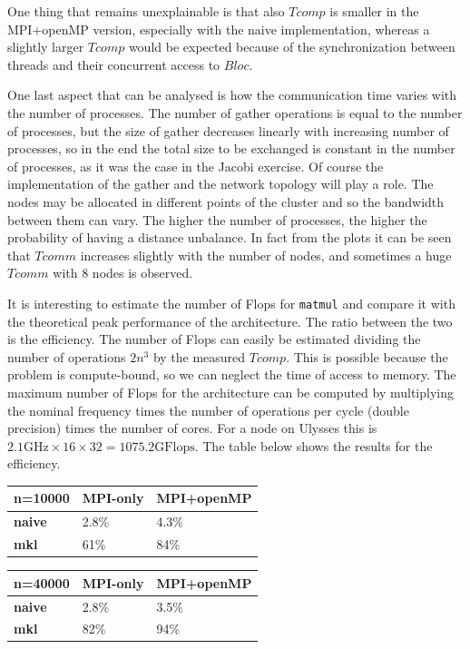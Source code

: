 \documentclass[12pt]{extarticle}
\begin{document}
One thing that remains unexplainable is that also $Tcomp$ is smaller in the MPI+openMP version, especially with the naive implementation, whereas a slightly larger $Tcomp$ would be expected because of the synchronization between threads and their concurrent access to $Bloc$. 
 
One last aspect that can be analysed is how the communication time varies with the number of processes. The number of gather operations is equal to the number of processes, but the size of gather decreases linearly with increasing number of processes, so in the end the total size to be exchanged is constant in the number of processes, as it was the case in the Jacobi exercise. Of course the implementation of the gather and the network topology will play a role. The nodes may be allocated in different points of the cluster and so the bandwidth between them can vary. The higher the number of processes, the higher the probability of having a distance unbalance. In fact from the plots it can be seen that $Tcomm$ increases slightly with the number of nodes, and sometimes a huge $Tcomm$ with 8 nodes is observed.

It is interesting to estimate the number of Flops for \texttt{matmul} and compare it with the theoretical peak performance of the architecture. The ratio between the two is the efficiency.
The number of Flops can easily be estimated dividing the number of operations $2n^3$ by the measured $Tcomp$. This is possible because the problem is compute-bound, so we can neglect the time of access to memory. The maximum number of Flops for the architecture can be computed by multiplying the nominal frequency times the number of operations per cycle (double precision) times the number of cores. For a node on Ulysses this is $2.1 \mathrm{GHz} \times 16 \times 32 = 1075.2 \mathrm{GFlops}$. The table below shows the results for the efficiency.

\begin{table}[H]
	\centering
	\begin{tabular}{l|ll}
		n=10000        & \textbf{MPI-only} & \textbf{MPI+openMP} \\ \hline
		\textbf{naive} & 2.8\%             & 4.3\%               \\
		\textbf{mkl}   & 61\%              & 84\%               
	\end{tabular}
\end{table}

\begin{table}[H]
	\centering
	\begin{tabular}{l|ll}
		n=40000        & \textbf{MPI-only} & \textbf{MPI+openMP} \\ \hline
		\textbf{naive} & 2.8\%              & 3.5\%                \\
		\textbf{mkl}   & 82\%               & 94\%                
	\end{tabular}
\end{table}
\end{document}
